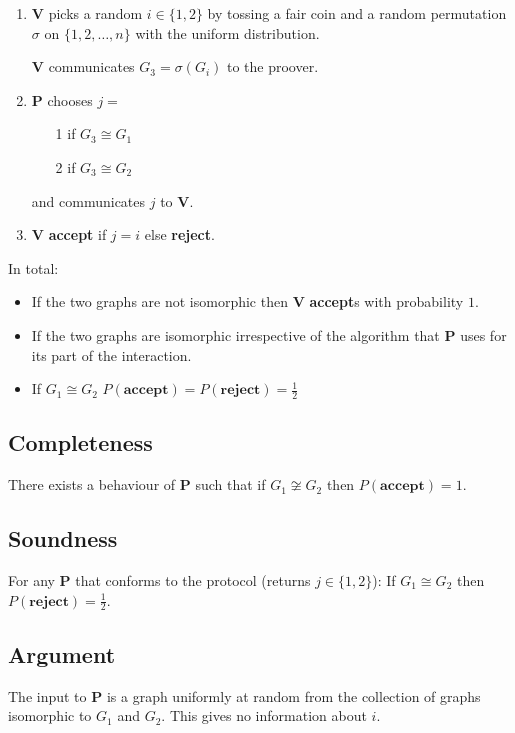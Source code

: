 \documentclass[a4paper,12pt]{article}
\theoremstyle{definition}
\theoremstyle{remark}
\begin{document}
\begin{enumerate}
    \item \textbf{V} picks a random $i \in \{1, 2\}$ by tossing a fair coin and a random permutation $\sigma$ on $\{1, 2, \dots, n\}$ with the uniform distribution.
        
    \textbf{V} communicates $G_3 = \sigma (G_i)$ to the proover.

    \item \textbf{P} chooses $j =$
    \begin{itemize}
        \item[1] if $G_3 \cong G_1$
        \item[2] if $G_3 \cong G_2$  
    \end{itemize}
    and communicates $j$ to \textbf{V}.
    
    \item \textbf{V} \textbf{accept} if $j = i$ else \textbf{reject}.
\end{enumerate}

In total:
\begin{itemize}
    \item If the two graphs are not isomorphic then \textbf{V} \textbf{accept}s with probability $1$.
    \item If the two graphs are isomorphic irrespective of the algorithm that \textbf{P} uses for its part of the interaction.
    \item If $G_1 \cong G_2$ $P(\textbf{accept}) = P(\textbf{reject})= \frac{1}{2}$
\end{itemize}

\subsection*{Completeness}
There exists a behaviour of \textbf{P} such that if $G_1 \not \cong G_2$ then $P(\textbf{accept}) = 1$.

\subsection*{Soundness}
For any \textbf{P} that conforms to the protocol (returns $j \in \{1, 2\}$):
If $G_1 \cong G_2$ then $P(\textbf{reject}) = \frac{1}{2}$.

\subsection*{Argument}
The input to \textbf{P} is a graph uniformly at random from the collection of graphs isomorphic to $G_1$ and $G_2$.
This gives no information about $i$.
\end{document}
